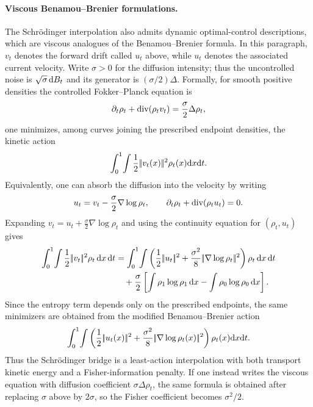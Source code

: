 \paragraph{Viscous Benamou--Brenier formulations.}
The Schr\"odinger interpolation also admits dynamic optimal-control descriptions, which are viscous analogues of the Benamou--Brenier formula. In this paragraph, $v_t$ denotes the forward drift called $u_t$ above, while $u_t$ denotes the associated current velocity. Write $\sigma>0$ for the diffusion intensity; thus the uncontrolled noise is $\sqrt{\sigma}\,\mathrm{d} B_t$ and its generator is $(\sigma/2)\Delta$. Formally, for smooth positive densities the controlled Fokker--Planck equation is
\[
	\partial_t\rho_t+\operatorname{div}(\rho_t v_t)
	=
	\frac{\sigma}{2}\Delta\rho_t,
\]
one minimizes, among curves joining the prescribed endpoint densities, the kinetic action
\[
	\int_0^1\!\int
	\frac12|\!| v_t(x) |\!|^2\rho_t(x)\mathrm{d} x\mathrm{d} t.
\]
Equivalently, one can absorb the diffusion into the velocity by writing
\[
	u_t=v_t-\frac{\sigma}{2}\nabla\log\rho_t,
	\qquad
	\partial_t\rho_t+\operatorname{div}(\rho_t u_t)=0.
\]
Expanding $v_t=u_t+\frac{\sigma}{2}\nabla\log\rho_t$ and using the continuity equation for $(\rho_t,u_t)$ gives
	\begin{align*}
		\int_0^1\!\int
		\frac12\norm{v_t}^2\rho_t\,\d x\,\d t
		&=
		\int_0^1\!\int
		\left(
			\frac12\norm{u_t}^2
		+
		\frac{\sigma^2}{8}\norm{\nabla\log\rho_t}^2
	\right)\rho_t\,\d x\,\d t
		\\
		&\quad+
		\frac{\sigma}{2}
		\left[
			\int\rho_1\log\rho_1\,\d x
		-
			\int\rho_0\log\rho_0\,\d x
		\right].
	\end{align*}
Since the entropy term depends only on the prescribed endpoints, the same minimizers are obtained from the modified Benamou--Brenier action
\[
	\int_0^1\!\int
	\left(
		\frac12|\!| u_t(x) |\!|^2
		+
		\frac{\sigma^2}{8}|\!| \nabla\log\rho_t(x) |\!|^2
	\right)
	\rho_t(x)\mathrm{d} x\mathrm{d} t.
\]
Thus the Schr\"odinger bridge is a least-action interpolation with both transport kinetic energy and a Fisher-information penalty. If one instead writes the viscous equation with diffusion coefficient $\sigma\Delta\rho_t$, the same formula is obtained after replacing $\sigma$ above by $2\sigma$, so the Fisher coefficient becomes $\sigma^2/2$.

